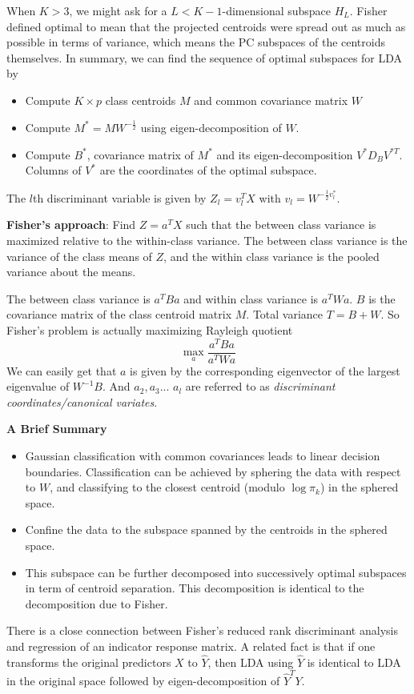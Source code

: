 When $K>3$, we might ask for a $L<K-1$-dimensional subspace $H_L$. Fisher defined optimal to
mean that the projected centroids were spread out as much as possible in terms of 
variance, which means the PC subspaces of the centroids themselves.
In summary, we can find the sequence of optimal subspaces for LDA by
\begin{itemize}
\item Compute $K\times p$ class centroids $M$ and common covariance matrix $W$
\item Compute $M^*=MW^{-\frac{1}{2}}$ using eigen-decomposition of $W$. 
\item Compute $B^*$, covariance matrix of $M^*$ and its eigen-decomposition 
$V^*D_BV^{*T}$. Columns of $V^*$ are the coordinates of the optimal subspace. 
\end{itemize}
The $l$th discriminant variable is given by $Z_l=v_l^TX$ with $v_l=W^{-\frac{1}{2}v_l^*}$. 

\textbf{Fisher's approach}: Find $Z=a^TX$ such that the between class
variance is maximized relative to the within-class variance. The between class 
variance is the variance of the class means of $Z$, and the within class variance is 
the pooled variance about the means. 

The between class variance is $a^TBa$ and within class variance is $a^TWa$. $B$ is
the covariance matrix of the class centroid matrix $M$. Total variance $T=B+W$. 
So Fisher's problem is actually maximizing Rayleigh quotient
\begin{equation*}
\max_a\frac{a^TBa}{a^TWa}
\end{equation*}
We can easily get that $a$ is given by the corresponding eigenvector of the largest 
eigenvalue of $W^{-1}B$. And $a_2,a_3$... $a_l$ are referred to as \textit{discriminant
coordinates/canonical variates}. 

\textbf{A Brief Summary}
\begin{itemize}
\item Gaussian classification with common covariances leads to linear decision
boundaries. Classification can be achieved by sphering the data
with respect to $W$, and classifying to the closest centroid (modulo
$\log\pi_k$) in the sphered space. 
\item Confine the data to the subspace spanned by the centroids in the sphered
space.
\item This subspace can be further decomposed into successively optimal
subspaces in term of centroid separation. This decomposition is identical
to the decomposition due to Fisher.
\end{itemize}
There is a close connection between Fisher’s reduced rank discriminant
analysis and regression of an indicator response matrix. A related fact is that 
if one transforms the original predictors $X$ to $\hat{Y}$, then LDA using $\hat{Y}$ 
is identical to LDA in the original space followed by eigen-decomposition of $\hat{Y}^TY$.

